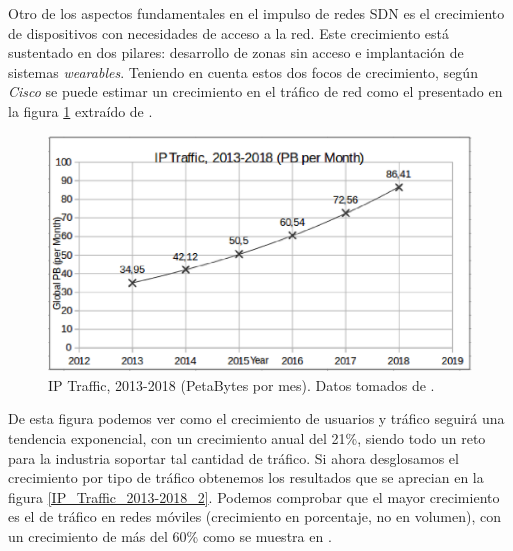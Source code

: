 \documentclass[a4paper,11pt]{book}
\begin{document}
Otro de los aspectos fundamentales en el impulso de redes \ac{SDN} es el crecimiento de dispositivos con necesidades de acceso a la red. Este crecimiento está sustentado en dos pilares: desarrollo de zonas sin acceso e implantación de sistemas \textit{wearables}. Teniendo en cuenta estos dos focos de crecimiento, según \textit{Cisco} se puede estimar un crecimiento en el tráfico de red como el presentado en la figura \ref{IP_Traffic_2013-2018} extraído de \cite{cisco2014cisco}\nocite{cisco2014cisco}.

\begin{figure}[tb]
\begin{center}
\includegraphics[scale=0.7]{./figuras/IPTraffic1}
\caption[IP Traffic, 2013-2018 (PetaBytes por mes).] {IP Traffic, 2013-2018 (PetaBytes por mes). Datos tomados de \cite{cisco2014cisco}.}
\label{IP_Traffic_2013-2018}
\end{center}
\end{figure}

De esta figura podemos ver como el crecimiento de usuarios y tráfico seguirá una tendencia exponencial, con un crecimiento anual del 21\%, siendo todo un reto para la industria soportar tal cantidad de tráfico. Si ahora desglosamos el crecimiento por tipo de tráfico obtenemos los resultados que se aprecian en la figura \ref{IP_Traffic_2013-2018_2}. Podemos comprobar que el mayor crecimiento es el de tráfico en redes móviles (crecimiento en porcentaje, no en volumen), con un crecimiento de más del 60\% como se muestra en \cite{cisco2014cisco}.
\end{document}
